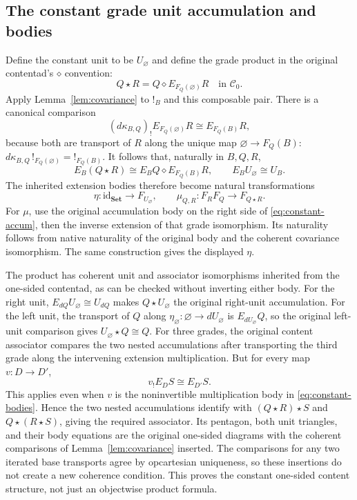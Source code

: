 \documentclass[11pt,a4paper]{article}
\theoremstyle{definition}
\newcommand{\Set}{\mathbf{Set}}
\newcommand{\id}{\mathrm{id}}
\newcommand{\diamondc}{\mathbin{\diamond}}
\begin{document}
\subsection{The constant grade unit accumulation and bodies}
Define the constant unit to be $U_\varnothing$ and define the grade product
in the original contentad's $\diamondc$ convention:
\begin{equation}\label{eq:constant-product}
 Q\star R=Q\diamondc E_{F_Q(\varnothing)}R
                    \quad\text{in }\mathcal C_0.
\end{equation}
Apply Lemma~\ref{lem:covariance} to $!_B$ and this composable pair.
There is a canonical comparison
\[
 (d\kappa_{B,Q})_!E_{F_Q(\varnothing)}R
       \cong E_{F_Q(B)}R,
\]
because both are transport of $R$ along the unique map
$\varnothing\to F_Q(B)$:
$d\kappa_{B,Q}\,!_{F_Q(\varnothing)}=!_{F_Q(B)}$.
It follows that, naturally in $B,Q,R$,
\begin{equation}\label{eq:constant-accum}
 E_B(Q\star R)\cong
       E_BQ\diamondc E_{F_Q(B)}R,\qquad
 E_BU_\varnothing\cong U_B.
\end{equation}
The inherited extension bodies therefore become natural transformations
\begin{equation}\label{eq:constant-bodies}
 \eta:\id_{\Set}\longrightarrow F_{U_\varnothing},\qquad
 \mu_{Q,R}:F_R F_Q\longrightarrow F_{Q\star R}.
\end{equation}
For $\mu$, use the original accumulation body on the right side of
\eqref{eq:constant-accum}, then the inverse extension of that grade
isomorphism. Its naturality follows from native naturality of the original
body and the coherent covariance isomorphism. The same construction gives
the displayed $\eta$.

The product has coherent unit and associator isomorphisms inherited from
the one-sided contentad, as can be checked without inverting either body.
For the right unit, $E_{dQ}U_\varnothing\cong U_{dQ}$ makes
$Q\star U_\varnothing$ the original right-unit accumulation. For the left
unit, the transport of $Q$ along
$\eta_\varnothing:\varnothing\to dU_\varnothing$ is
$E_{dU_\varnothing}Q$, so the original left-unit comparison gives
$U_\varnothing\star Q\cong Q$.
For three grades, the original content associator compares the two nested
accumulations after transporting the third grade along the intervening
extension multiplication. But for every map $v:D\to D'$,
\[
 v_!E_D S\cong E_{D'}S.
\]
This applies even when $v$ is the noninvertible multiplication body in
\eqref{eq:constant-bodies}. Hence the two nested accumulations identify
with $(Q\star R)\star S$ and $Q\star(R\star S)$, giving the required
associator. Its pentagon, both unit triangles, and their body equations
are the original one-sided diagrams with the coherent comparisons of
Lemma~\ref{lem:covariance} inserted. The comparisons for any two iterated
base transports agree by opcartesian uniqueness, so these insertions do
not create a new coherence condition. This proves the constant one-sided
content structure, not just an objectwise product formula.
\end{document}
